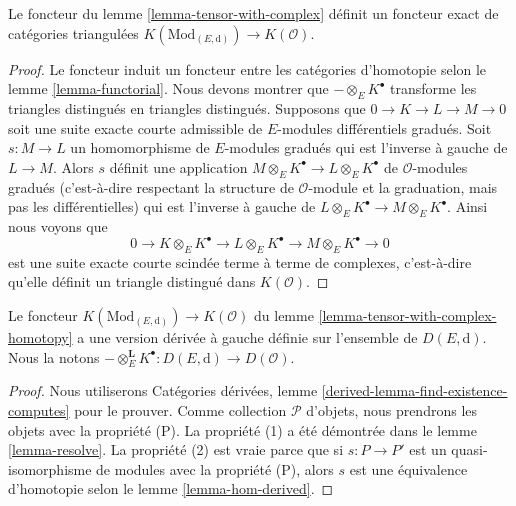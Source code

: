 \begin{lemma}
\label{lemma-tensor-with-complex-homotopy}
Le foncteur du lemme \ref{lemma-tensor-with-complex} définit un foncteur exact
de catégories triangulées
$K(\text{Mod}_{(E, \text{d})}) \to K(\mathcal{O})$.
\end{lemma}

\begin{proof}
Le foncteur induit un foncteur entre les catégories d'homotopie
selon le lemme
\ref{lemma-functorial}. Nous devons montrer que $- \otimes_E K^\bullet$ transforme les triangles
distingués en triangles distingués. Supposons
que $0 \to K \to L \to M \to 0$ soit une suite exacte courte admissible de
$E$-modules différentiels gradués. Soit $s : M \to L$ un homomorphisme de
$E$-modules gradués qui est l'inverse à gauche de $L \to M$. Alors $s$ définit une
application $M \otimes_E K^\bullet \to L \otimes_E K^\bullet$ de
$\mathcal{O}$-modules gradués (c'est-à-dire respectant la structure de $\mathcal{O}$-module et
la graduation, mais pas les différentielles) qui est
l'inverse à gauche de $L \otimes_E K^\bullet \to M \otimes_E K^\bullet$. Ainsi nous
voyons que
$$
0 \to K \otimes_E K^\bullet \to L \otimes_E K^\bullet \to
M \otimes_E K^\bullet \to 0
$$
est une suite exacte courte scindée terme à terme de complexes,
c'est-à-dire qu'elle définit un triangle distingué dans $K(\mathcal{O})$.
\end{proof}

\begin{lemma}
\label{lemma-tensor-with-complex-derived}
Le foncteur $K(\text{Mod}_{(E, \text{d})}) \to K(\mathcal{O})$ du
lemme \ref{lemma-tensor-with-complex-homotopy} a une version dérivée à
gauche définie sur l'ensemble de $D(E, \text{d})$. Nous la
notons $- \otimes_E^\mathbf{L} K^\bullet : D(E, \text{d}) \to D(\mathcal{O})$.
\end{lemma}

\begin{proof}
Nous
utiliserons Catégories dérivées, lemme \ref{derived-lemma-find-existence-computes} pour
le prouver. Comme collection $\mathcal{P}$ d'objets,
nous prendrons les objets avec la propriété (P). La propriété (1)
a été démontrée dans le lemme \ref{lemma-resolve}. La
propriété (2) est vraie parce que si $s : P \to P'$ est un quasi-isomorphisme de
modules avec la propriété (P), alors $s$ est une équivalence d'homotopie selon
le lemme \ref{lemma-hom-derived}.
\end{proof}

